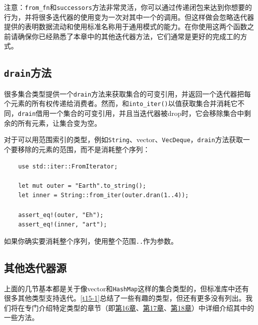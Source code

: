 注意：\texttt{from\_fn}和\texttt{successors}方法非常灵活，你可以通过传递闭包来达到你想要的行为，并将很多迭代器的使用变为一次对其中一个的调用。但这样做会忽略迭代器提供的表明数据流动和使用标准名称用于通用模式的能力。在你使用这两个函数之前请确保你已经熟悉了本章中的其他迭代器方法，它们通常是更好的完成工的方式。

\subsection{\texttt{drain}方法}
很多集合类型提供一个\texttt{drain}方法来获取集合的可变引用，并返回一个迭代器把每个元素的所有权传递给消费者。然而，和\texttt{into\_iter()}以值获取集合并消耗它不同，\texttt{drain}借用一个集合的可变引用，并且当迭代器被drop时，它会移除集合中剩余的所有元素，让集合变为空。

对于可以用范围索引的类型，例如\texttt{String}、vector、\texttt{VecDeque}，\texttt{drain}方法获取一个要移除的元素的范围，而不是消耗整个序列：
\begin{verbatim}
    use std::iter::FromIterator;

    let mut outer = "Earth".to_string();
    let inner = String::from_iter(outer.dran(1..4));

    assert_eq!(outer, "Eh");
    assert_eq!(inner, "art");
\end{verbatim}

如果你确实要消耗整个序列，使用整个范围\texttt{..}作为参数。

\subsection{其他迭代器源}
上面的几节基本都是关于像vector和\texttt{HashMap}这样的集合类型的，但标准库中还有很多其他类型支持迭代。\autoref{t15-1}总结了一些有趣的类型，但还有更多没有列出。我们将在专门介绍特定类型的章节（即\hyperref[ch16]{第16章}、\hyperref[ch17]{第17章}、\hyperref[ch18]{第18章}）中详细介绍其中的一些方法。

